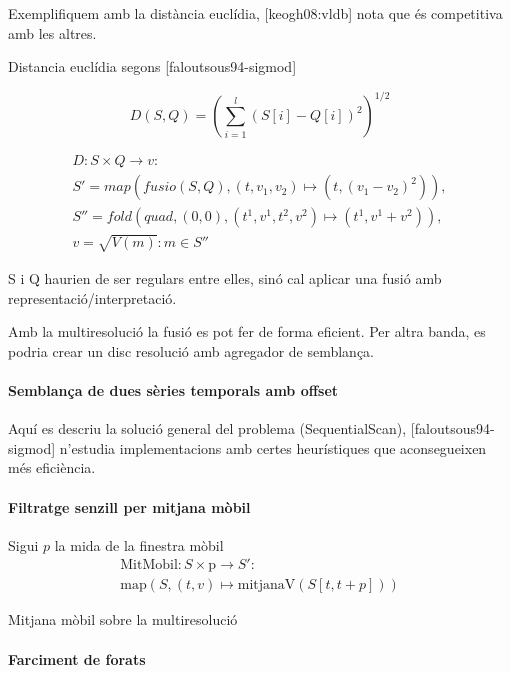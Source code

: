 Exemplifiquem amb la distància euclídia, [keogh08:vldb] nota que és
competitiva amb les altres.

Distancia euclídia segons [faloutsous94-sigmod]


\[
D(S,Q) = \left( \sum_{i=1}^{l} (S[i]-Q[i])^2  \right)^{1/2}
\]

\begin{gather*}
  D: S \times Q \longrightarrow v: \\
  S' = map(fusio(S,Q),(t,v_1,v_2)\mapsto(t,(v_1-v_2)^2)), \\
  S'' = fold(quad,(0,0),(t^1,v^1,t^2,v^2)\mapsto(t^1,v^1+v^2)), \\
  v = \sqrt{V(m)}:m\in S''
\end{gather*}


S i Q haurien de ser regulars entre elles, sinó cal aplicar una fusió amb representació/interpretació.

Amb la multiresolució la fusió es pot fer de forma eficient. Per altra banda, es podria crear un disc resolució amb agregador de semblança.


\paragraph{Semblança de dues sèries temporals amb offset}

Aquí es descriu la solució general del problema (SequentialScan),
[faloutsous94-sigmod] n'estudia implementacions amb certes
heurístiques que aconsegueixen més eficiència.





\paragraph{Filtratge senzill per mitjana mòbil}

Sigui $p$ la mida de la finestra mòbil
\begin{gather*}
  \text{MitMobil}: S \times \text{p} \longrightarrow S':\\
  \text{map}(S,(t,v)\mapsto \text{mitjanaV}(S[t,t+p]))
\end{gather*}


Mitjana mòbil sobre la multiresolució



\paragraph{Farciment de forats}

